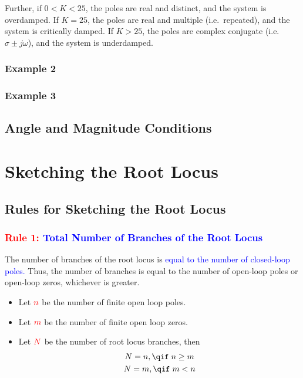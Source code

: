 \documentclass[
  14pt,
  a4paper,
  oneside,
  open=any,
  a4paper,
  14pt]{report}
\providecommand{\tightlist}{%
  \setlength{\itemsep}{0pt}\setlength{\parskip}{0pt}}\usepackage{longtable,booktabs,array}
\begin{document}
Further, if \(0<K<25\), the poles are real and distinct, and the system
is overdamped. If \(K=25\), the poles are real and multiple
(i.e.~repeated), and the system is critically damped. If \(K>25\), the
poles are complex conjugate (i.e.~\(\sigma \pm j\omega\)), and the
system is underdamped.

\subsubsection{Example 2}\label{example-2-3}

\subsubsection{Example 3}\label{example-3-2}

\subsection{Angle and Magnitude
Conditions}\label{angle-and-magnitude-conditions}

\section{Sketching the Root Locus}\label{sketching-the-root-locus}

\subsection{Rules for Sketching the Root
Locus}\label{rules-for-sketching-the-root-locus}

\subsubsection*{\texorpdfstring{\textcolor{red}{Rule 1:}
\textcolor{blue}{Total Number of Branches of the Root
Locus}}{Rule 1: Total Number of Branches of the Root Locus}}\label{rule-1-total-number-of-branches-of-the-root-locus}

The number of branches of the root locus is \textcolor{blue}{equal to
the number of closed-loop poles.} Thus, the number of branches is equal
to the number of open-loop poles or open-loop zeros, whichever is
greater.

\begin{itemize}
\tightlist
\item
  Let \(\textcolor{red}{n}\) be the number of finite open loop poles.
\item
  Let \(\textcolor{red}{m}\) be the number of finite open loop zeros.
\item
  Let \(\textcolor{red}{N}\) be the number of root locus branches, then
  \begin{gather}
    N = n, \qif \; n \geq m \\
    N = m, \qif \; m < n
  \end{gather}
\end{itemize}
\end{document}
